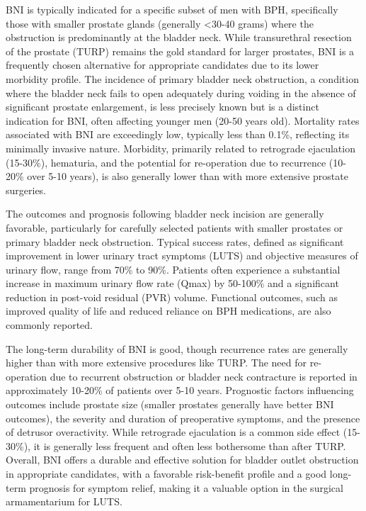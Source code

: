 BNI is typically indicated for a specific subset of men with BPH, specifically those with smaller prostate glands (generally <30-40 grams) where the obstruction is predominantly at the bladder neck. While transurethral resection of the prostate (TURP) remains the gold standard for larger prostates, BNI is a frequently chosen alternative for appropriate candidates due to its lower morbidity profile. The incidence of primary bladder neck obstruction, a condition where the bladder neck fails to open adequately during voiding in the absence of significant prostate enlargement, is less precisely known but is a distinct indication for BNI, often affecting younger men (20-50 years old). Mortality rates associated with BNI are exceedingly low, typically less than 0.1\%, reflecting its minimally invasive nature. Morbidity, primarily related to retrograde ejaculation (15-30\%), hematuria, and the potential for re-operation due to recurrence (10-20\% over 5-10 years), is also generally lower than with more extensive prostate surgeries.

The outcomes and prognosis following bladder neck incision are generally favorable, particularly for carefully selected patients with smaller prostates or primary bladder neck obstruction. Typical success rates, defined as significant improvement in lower urinary tract symptoms (LUTS) and objective measures of urinary flow, range from 70\% to 90\%. Patients often experience a substantial increase in maximum urinary flow rate (Qmax) by 50-100\% and a significant reduction in post-void residual (PVR) volume. Functional outcomes, such as improved quality of life and reduced reliance on BPH medications, are also commonly reported.

The long-term durability of BNI is good, though recurrence rates are generally higher than with more extensive procedures like TURP. The need for re-operation due to recurrent obstruction or bladder neck contracture is reported in approximately 10-20\% of patients over 5-10 years. Prognostic factors influencing outcomes include prostate size (smaller prostates generally have better BNI outcomes), the severity and duration of preoperative symptoms, and the presence of detrusor overactivity. While retrograde ejaculation is a common side effect (15-30\%), it is generally less frequent and often less bothersome than after TURP. Overall, BNI offers a durable and effective solution for bladder outlet obstruction in appropriate candidates, with a favorable risk-benefit profile and a good long-term prognosis for symptom relief, making it a valuable option in the surgical armamentarium for LUTS.

